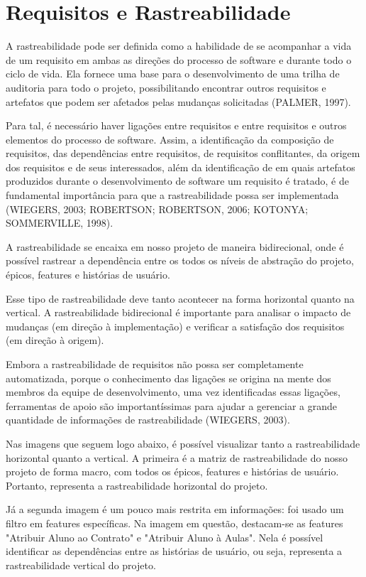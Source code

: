 \section[Requisitos e Rastreabilidade]{Requisitos e Rastreabilidade}
A rastreabilidade pode ser definida como a habilidade de se acompanhar a vida
de um requisito em ambas as direções do processo de software e durante todo o ciclo de
vida. Ela fornece uma base para o desenvolvimento de uma trilha de auditoria para todo
o projeto, possibilitando encontrar outros requisitos e artefatos que podem ser afetados
pelas mudanças solicitadas (PALMER, 1997). 

Para tal, é necessário haver ligações entre requisitos e entre requisitos e outros elementos do processo de software. Assim, a identificação da composição de requisitos, das dependências entre requisitos, de
requisitos conflitantes, da origem dos requisitos e de seus interessados, além da
identificação de em quais artefatos produzidos durante o desenvolvimento de software
um requisito é tratado, é de fundamental importância para que a rastreabilidade possa
ser implementada (WIEGERS, 2003; ROBERTSON; ROBERTSON, 2006;
KOTONYA; SOMMERVILLE, 1998). 

A rastreabilidade se encaixa em nosso projeto de maneira bidirecional, onde é
possível rastrear a dependência entre os todos os níveis de abstração do projeto,
épicos, features e histórias de usuário.

Esse tipo de rastreabilidade deve tanto acontecer na forma horizontal quanto
na vertical. A rastreabilidade bidirecional é importante para analisar o impacto
de mudanças (em direção à implementação) e verificar a satisfação dos
requisitos (em direção à origem).

Embora a rastreabilidade de requisitos não possa ser completamente
automatizada, porque o conhecimento das ligações se origina na mente dos membros da
equipe de desenvolvimento, uma vez identificadas essas ligações, ferramentas de apoio
são importantíssimas para ajudar a gerenciar a grande quantidade de informações de
rastreabilidade (WIEGERS, 2003). 

Nas imagens que seguem logo abaixo, é possível visualizar tanto a rastreabilidade horizontal quanto a vertical. A primeira é a matriz de rastreabilidade do nosso projeto de forma macro, com todos os épicos, features e histórias de usuário. Portanto, representa a rastreabilidade horizontal do projeto.

Já a segunda imagem é um pouco mais restrita em informações: foi usado um filtro em features específicas. Na imagem em questão, destacam-se as features "Atribuir Aluno ao Contrato" e "Atribuir Aluno à Aulas". Nela é possível identificar as dependências entre as histórias de usuário, ou seja, representa a rastreabilidade vertical do projeto.

